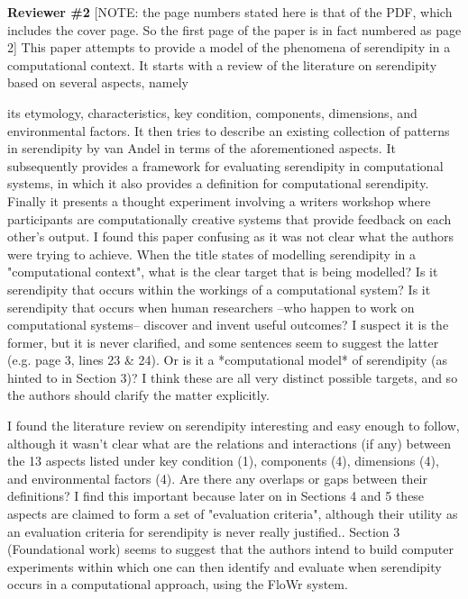 \textbf{Reviewer \#2}
[NOTE: the page numbers stated here is that of the PDF, which includes the cover page. So the
first page of the paper is in fact numbered as page 2]
This paper attempts to provide a model of the phenomena of serendipity in a computational
context. It starts with a review of the literature on serendipity based on several aspects, namely

its etymology, characteristics, key condition, components, dimensions, and environmental
factors. It then tries to describe an existing collection of patterns in serendipity by van Andel in
terms of the aforementioned aspects. It subsequently provides a framework for evaluating
serendipity in computational systems, in which it also provides a definition for computational
serendipity. Finally it presents a thought experiment involving a writers workshop where
participants are computationally creative systems that provide feedback on each other's output.
I found this paper confusing as it was not clear what the authors were trying to achieve. 
When
the title states of modelling serendipity in a "computational context", what is the clear
target that is being modelled? Is it serendipity that occurs within the workings of a
computational system? Is it serendipity that occurs when human researchers --who
happen to work on computational systems-- discover and invent useful outcomes? I
suspect it is the former, but it is never clarified, and some sentences seem to suggest the
latter (e.g. page 3, lines 23 \& 24). Or is it a *computational model* of serendipity (as hinted to
in Section 3)? I think these are all very distinct possible targets, and so the authors should
clarify the matter explicitly.

I found the literature review on serendipity interesting and easy enough to follow, although it
wasn't clear what are the relations and interactions (if any) between the 13 aspects listed under
key condition (1), components (4), dimensions (4), and environmental factors (4). Are there any
overlaps or gaps between their definitions? I find this important because later on in Sections 4
and 5 these aspects are claimed to form a set of "evaluation criteria", although their utility as
an evaluation criteria for serendipity is never really justified..
Section 3 (Foundational work) seems to suggest that the authors intend to build computer
experiments within which one can then identify and evaluate when serendipity occurs in a
computational approach, using the FloWr system.

